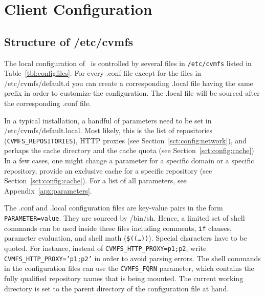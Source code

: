 \chapter{Client Configuration}

\section{Structure of /etc/cvmfs}
The local configuration of \cvmfs\ is controlled by several files in \texttt{/etc/cvmfs} listed in Table~\ref{tbl:configfiles}.
For every .conf file except for the files in /etc/cvmfs/default.d you can create a corresponding .local file having the same prefix in order to customize the configuration.
The .local file will be sourced after the corresponding .conf file.

In a typical installation, a handful of parameters need to be set in /etc/cvmfs/default.local.
Most likely, this is the list of repositories (\texttt{CVMFS\_REPOSITORIES}), HTTP proxies (see Section~\ref{sct:config:network}), and perhaps the cache directory and the cache quota (see Section~\ref{sct:config:cache})
In a few cases, one might change a parameter for a specific domain or a specific repository, \eg provide an exclusive cache for a specific repository (see Section~\ref{sct:config:cache}).
For a list of all parameters, see Appendix~\ref{apx:parameters}.

The .conf and .local configuration files are key-value pairs in the form \texttt{PARAMETER=value}.
They are sourced by /bin/sh.
Hence, a limited set of shell commands can be used inside these files including comments, \texttt{if} clauses, parameter evaluation, and shell math (\texttt{\$((\dots))}).
Special characters have to be quoted.
For instance, instead of \texttt{CVMFS\_HTTP\_PROXY=p1;p2}, write \texttt{CVMFS\_HTTP\_PROXY='p1;p2'} in order to avoid parsing errors.
The shell commands in the configuration files can use the \texttt{CVMFS\_FQRN} parameter, which contains the fully qualified repository names that is being mounted.
The current working directory is set to the parent directory of the configuration file at hand.

